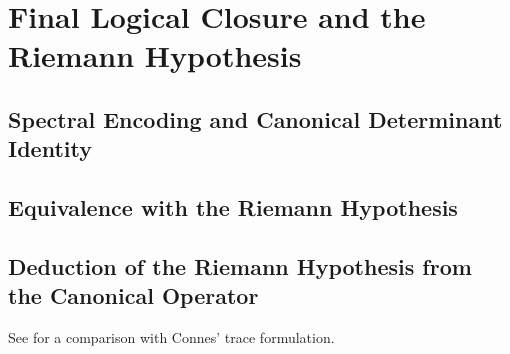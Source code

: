 \section{Final Logical Closure and the Riemann Hypothesis}
\label{sec:logical_closure}





\subsection{Spectral Encoding and Canonical Determinant Identity}










\subsection{Equivalence with the Riemann Hypothesis}







\subsection{Deduction of the Riemann Hypothesis from the Canonical Operator}







See  for a comparison with Connes’ trace formulation.


